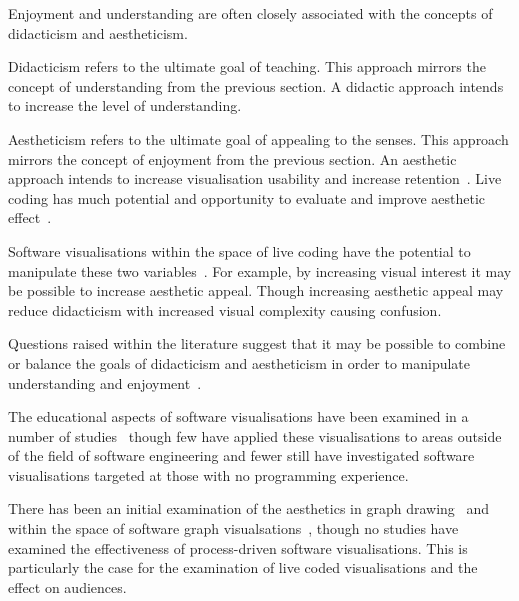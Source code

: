 Enjoyment and understanding are often closely associated with the concepts of didacticism and aestheticism.

Didacticism refers to the ultimate goal of teaching. This approach mirrors the concept of understanding from the previous section. A didactic approach intends to increase the level of understanding.

Aestheticism refers to the ultimate goal of appealing to the senses. This approach mirrors the concept of enjoyment from the previous section. An aesthetic approach intends to increase visualisation usability and increase retention~\cite{Cawthon2007}. Live coding has much potential and opportunity to evaluate and improve aesthetic effect~\cite{Bell}.


Software visualisations within the space of live coding have the potential to manipulate these two variables~\cite{Iru,McLean2010a}. For example, by increasing visual interest it may be possible to increase aesthetic appeal. Though increasing aesthetic appeal may reduce didacticism with increased visual complexity causing confusion.

Questions raised within the literature suggest that it may be possible to combine or balance the goals of didacticism and aestheticism in order to manipulate understanding and enjoyment~.


The educational aspects of software visualisations have been examined in a number of studies~ though few have applied these visualisations to areas outside of the field of software engineering and fewer still have investigated software visualisations targeted at those with no programming experience.

There has been an initial examination of the aesthetics in graph drawing~ and within the space of software graph visualsations~, though no studies have examined the effectiveness of process-driven software visualisations. This is particularly the case for the examination of live coded visualisations and the effect on audiences.

